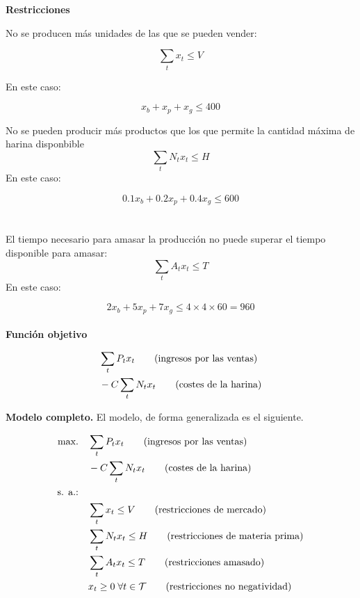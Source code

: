 \textbf{Restricciones}

No se producen más unidades de las que se pueden vender:

\begin{equation}
    \sum_t{x_t} \leq V
\end{equation}

En este caso: 

\begin{equation}
    x_b + x_p + x_g \leq 400
\end{equation}


No se pueden producir más productos que los que permite la cantidad máxima de harina disponbible
\begin{equation}
    \sum_t{N_tx_t} \leq H
\end{equation}
En este caso: 

\begin{equation}
    0.1x_b + 0.2x_p + 0.4x_g \leq 600
\end{equation}
\\
\\
El tiempo necesario para amasar la producción no puede superar el tiempo disponible para amasar:
\begin{equation}
    \sum_t{A_tx_t} \leq T
\end{equation}
En este caso: 

\begin{equation}
    2x_b + 5x_p + 7x_g \leq 4\times4\times 60 = 960
\end{equation}
\\

\textbf{Función objetivo}

\begin{align}
             & \sum_tP_t{x_t}  \qquad \mbox{(ingresos por las ventas)} \notag \\
             & -C\sum_t  N_t {x_t} \qquad \mbox{(costes de la harina)} 
\end{align} 



\textbf{Modelo completo.}
El modelo, de forma generalizada es el siguiente.


\begin{align}
\mbox{max.} \quad & \sum_tP_t{x_t}  \qquad \mbox{(ingresos por las ventas)} \notag \\
             & -C\sum_t  N_t {x_t} \qquad \mbox{(costes de la harina)} \\
\mbox{s. a.:} \quad &  \notag \\		
             & \sum_t{x_t} \leq V \qquad\mbox{(restricciones de mercado)}  \\
             &  \sum_t{N_tx_t} \leq H \qquad\mbox{(restricciones de materia prima)}    \\
             & \sum_t{A_tx_t} \leq T \qquad \mbox{(restricciones amasado)}  \\
             & x_t  \geq 0 \; \forall t \in \mathcal{T} \qquad \mbox{(restricciones no negatividad)}
\end{align} 

